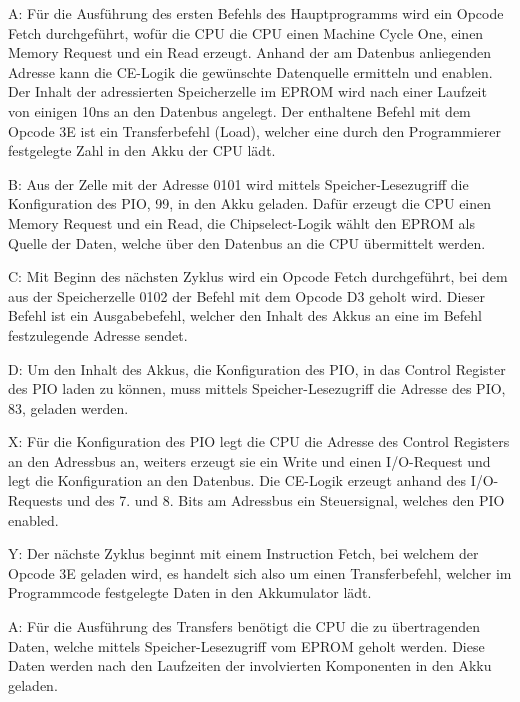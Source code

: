 A: Für die Ausführung des ersten Befehls des Hauptprogramms wird ein Opcode Fetch durchgeführt, wofür die CPU die CPU einen Machine Cycle One, einen Memory Request und ein Read erzeugt. Anhand der am Datenbus anliegenden Adresse kann die CE-Logik die gewünschte Datenquelle ermitteln und enablen. Der Inhalt der adressierten Speicherzelle im EPROM wird nach einer Laufzeit von einigen 10ns an den Datenbus angelegt. Der enthaltene Befehl mit dem Opcode 3E ist ein Transferbefehl (Load), welcher eine durch den Programmierer festgelegte Zahl in den Akku der CPU lädt.

B: Aus der Zelle mit der Adresse 0101 wird mittels Speicher-Lesezugriff die Konfiguration des PIO, 99, in den Akku geladen. Dafür erzeugt die CPU einen Memory Request und ein Read, die Chipselect-Logik wählt den EPROM als Quelle der Daten, welche über den Datenbus an die CPU übermittelt werden.

C: Mit Beginn des nächsten Zyklus wird ein Opcode Fetch durchgeführt, bei dem aus der Speicherzelle 0102 der Befehl mit dem Opcode D3 geholt wird. Dieser Befehl ist ein Ausgabebefehl, welcher den Inhalt des Akkus an eine im Befehl festzulegende Adresse sendet.

D: Um den Inhalt des Akkus, die Konfiguration des PIO, in das Control Register des PIO laden zu können, muss mittels Speicher-Lesezugriff die Adresse des PIO, 83, geladen werden.

X: Für die Konfiguration des PIO legt die CPU die Adresse des Control Registers an den Adressbus an, weiters erzeugt sie ein Write und einen I/O-Request und legt die Konfiguration an den Datenbus. Die CE-Logik erzeugt anhand des I/O-Requests und des 7. und 8. Bits am Adressbus ein Steuersignal, welches den PIO enabled.

Y: Der nächste Zyklus beginnt mit einem Instruction Fetch, bei welchem der Opcode 3E geladen wird, es handelt sich also um einen Transferbefehl, welcher im Programmcode festgelegte Daten in den Akkumulator lädt.

A: Für die Ausführung des Transfers benötigt die CPU die zu übertragenden Daten, welche mittels Speicher-Lesezugriff vom EPROM geholt werden. Diese Daten werden nach den Laufzeiten der involvierten Komponenten in den Akku geladen.

